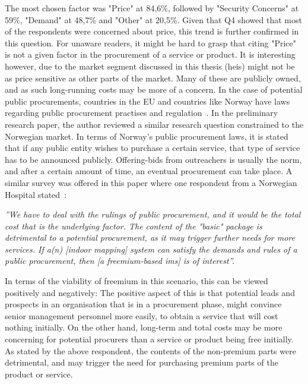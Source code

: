 The most chosen factor was "Price" at 84,6\%, followed by "Security Concerns" at 59\%, "Demand" at 48,7\% and "Other" at 20,5\%. Given that Q4 showed that most of the respondents were concerned about price, this trend is further confirmed in this question. For unaware readers, it might be hard to grasp that citing "Price" is not a given factor in the procurement of a service or product. It is interesting however, due to the market segment discussed in this thesis (\glspl{hei}) might not be as price sensitive as other parts of the market. Many of these are publicly owned, and as such long-running costs may be more of a concern. In the case of potential public procurements, countries in the EU and countries like Norway have laws regarding public procurement practises and regulation~\cite{europeancommision}\cite{procurement}. In the preliminary research paper, the author reviewed a similar research question constrained to the Norwegian market. In terms of Norway's public procurement laws, it is stated that if any public entity wishes to purchase a certain service, that type of service has to be announced publicly. Offering-bids from outreachers is usually the norm, and after a certain amount of time, an eventual procurement can take place. A similar survey was offered in this paper where one respondent from a Norwegian Hospital stated~\cite{kristiantagesen2015}:
\newpage
\begin{displayquote}
\textit{''We have to deal with the rulings of public procurement, and it would be the total cost that is the underlying factor. The content of the "basic" package is detrimental to a potential procurement, as it may trigger further needs for more services. If a(n) [indoor mapping] system can satisfy the demands and rules of a public procurement, then [a freemium-based \gls{ims}] is of interest''.}
\end{displayquote}
In terms of the viability of freemium in this scenario, this can be viewed positively and negatively: The positive aspect of this is that potential leads and prospects in an organisation that is in a procurement phase, might convince senior management personnel more easily, to obtain a service that will cost nothing initially. On the other hand, long-term and total costs may be more concerning for potential procurers than a service or product being free initially. As stated by the above respondent, the contents of the non-premium parts were detrimental, and may trigger the need for purchasing premium parts of the product or service.